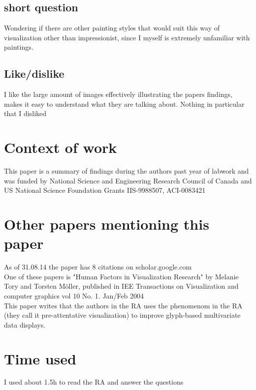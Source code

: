 \documentclass{article}
\begin{document}
\subsection*{short question}

Wondering if there are other painting styles that would suit this way of visualization other than impressionist, since I myself is extremely unfamiliar with paintings.

\subsection*{Like/dislike}

I like the large amount of images effectively illustrating the papers findings, makes it easy to understand what they are talking about. Nothing in particular that I disliked

\section{Context of work}

This paper is a summary of findings during the authors past year of labwork and was funded by National Science and Engineering Research Council of Canada and US National Science Foundation Grants IIS-9988507, ACI-0083421

\section{Other papers mentioning this paper}

As of 31.08.14 the paper has 8 citations on scholar.google.com\\
One of these papers is "Human Factors in Visualization Research" by Melanie Tory and Torsten Möller, published in IEE Transactions on Visualization and computer graphics vol 10 No. 1. Jan/Feb 2004\\
This paper writes that the authors in the RA uses the phenomenom in the RA (they call it pre-attentative visualization) to improve glyph-based multivariate data displays.

\section{Time used}
I used about 1.5h to read the RA and answer the questions
\end{document}
